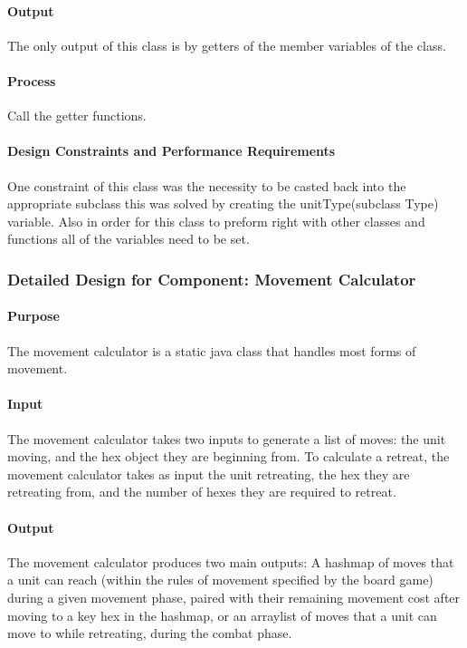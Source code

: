 \documentclass[12pt,a4paper,titlepage]{article}
\begin{document}
\paragraph{Output} The only output of this class is by getters of the member variables of the class. 
\paragraph{Process} Call the getter functions.
\paragraph{Design Constraints and Performance Requirements} One constraint of this class was the necessity to be casted back into the appropriate subclass this was solved by creating the unitType(subclass Type) variable. Also in order for this class to preform right with other classes and functions all of the variables need to be set. 
	
\subsubsection{Detailed Design for Component: Movement Calculator}
\paragraph{Purpose} The movement calculator is a static java class that handles most forms of movement. 
\paragraph{Input} The movement calculator takes two inputs to generate a list of moves: the unit moving, and the hex object they are beginning from. To calculate a retreat, the movement calculator takes as input the unit retreating, the hex they are retreating from, and the number of hexes they are required to retreat.
\paragraph{Output} The movement calculator produces two main outputs: A hashmap of moves that a unit can reach (within the rules of movement specified by the board game) during a given movement phase, paired with their remaining movement cost after moving to a key hex in the hashmap, or an arraylist of moves that a unit can move to while retreating, during the combat phase.
\end{document}
